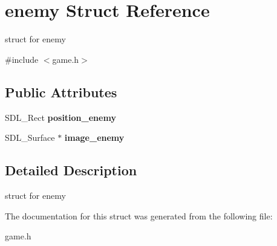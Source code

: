 \hypertarget{structenemy}{}\section{enemy Struct Reference}
\label{structenemy}


struct for enemy  




{\ttfamily \#include $<$game.\+h$>$}

\subsection*{Public Attributes}
\begin{DoxyCompactItemize}
\item 
\mbox{\label{structenemy_a70662a0b9becc1763ef18f022b668696}} 
S\+D\+L\+\_\+\+Rect {\bfseries position\+\_\+enemy}
\item 
\mbox{\label{structenemy_a39fbc07cd1f9630e235fdd1b0912aeaa}} 
S\+D\+L\+\_\+\+Surface $\ast$ {\bfseries image\+\_\+enemy}
\end{DoxyCompactItemize}


\subsection{Detailed Description}
struct for enemy 

The documentation for this struct was generated from the following file\+:\begin{DoxyCompactItemize}
\item 
game.\+h\end{DoxyCompactItemize}

